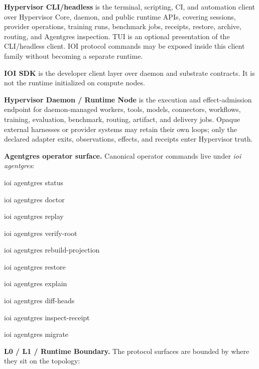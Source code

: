 \documentclass[
  11pt,
]{article}
\begin{document}
\textbf{Hypervisor CLI/headless} is the terminal, scripting, CI, and
automation client over Hypervisor Core, daemon, and public runtime APIs,
covering sessions, provider operations, training runs, benchmark jobs,
receipts, restore, archive, routing, and Agentgres inspection. TUI is an
optional presentation of the CLI/headless client. IOI protocol commands
may be exposed inside this client family without becoming a separate
runtime.

\textbf{IOI SDK} is the developer client layer over daemon and
substrate contracts. It is not the runtime initialized on compute nodes.

\textbf{Hypervisor Daemon / Runtime Node} is the execution and effect-admission
endpoint for daemon-managed workers, tools, models, connectors, workflows,
training, evaluation, benchmark, routing, artifact, and delivery jobs. Opaque
external harnesses or provider systems may retain their own loops; only the
declared adapter exits, observations, effects, and receipts enter Hypervisor
truth.

\textbf{Agentgres operator surface.} Canonical operator commands live
under \emph{ioi agentgres}:

ioi agentgres status

ioi agentgres doctor

ioi agentgres replay

ioi agentgres verify-root

ioi agentgres rebuild-projection

ioi agentgres restore

ioi agentgres explain

ioi agentgres diff-heads

ioi agentgres inspect-receipt

ioi agentgres migrate

\textbf{L0 / L1 / Runtime Boundary.} The protocol surfaces are bounded
by where they sit on the topology:
\end{document}
